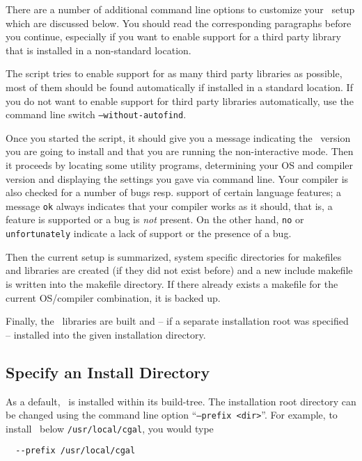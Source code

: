 There are a number of additional command line options to customize
your \cgal\ setup which are discussed below. You should read the
corresponding paragraphs before you continue, especially if you want
to enable support for a third party library that is installed in a
non-standard location.

The script tries to enable support for as many third party libraries
as possible, most of them should be found automatically if installed
in a standard location. If you do not want to enable support for third
party libraries automatically, use the command line switch
\texttt{--without-autofind}.

Once you started the script, it should give you a message indicating
the \cgal\ version you are going to install and that you are running
the non-interactive mode. Then it proceeds by locating some utility
programs, determining your OS and compiler version and displaying the
settings you gave via command line. Your compiler is also checked for
a number of bugs resp. support of certain language features; a message
\texttt{ok} always indicates that your compiler works as it should,
that is, a feature is supported or a bug is \textit{not} present. On
the other hand, \texttt{no} or \texttt{unfortunately} indicate a lack
of support or the presence of a bug.

Then the current setup is summarized, system specific directories for
makefiles and libraries are created (if they did not exist before) and
a new include makefile is written into the makefile directory. If
there already exists a makefile for the current OS/compiler
combination, it is backed up.

Finally, the \cgal\ libraries are built and -- if a separate
installation root was specified -- installed into the given
installation directory.

\subsection{Specify an Install Directory\label{sec:install-setup}}

As a default, \cgal\ is installed within its build-tree. The
installation root directory can be changed using the command line
option ``\texttt{--prefix <dir>}''. For example, to install \cgal\
below \texttt{/usr/local/cgal}, you would type
\begin{verbatim}
  --prefix /usr/local/cgal
\end{verbatim}

